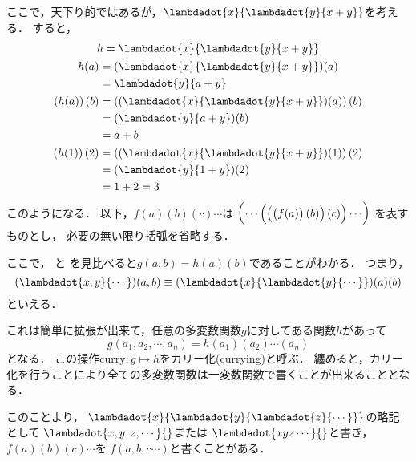 \documentclass[a4paper,titlepage,report]{jsbook}
\begin{document}
ここで，天下り的ではあるが，$\lambdadot{x}{\lambdadot{y}{x+y}}$を考える．
すると，
\begin{gather}
\begin{aligned}
\label{eq:lambda-curried}
h &= \lambdadot{x}{\lambdadot{y}{x+y}} \\
\end{aligned} \\
\begin{aligned}
\label{eq:lambda-curried-partial}
h(a) &= (\lambdadot{x}{\lambdadot{y}{x+y}})(a)\\
     &= {\lambdadot{y}{a+y}}
\end{aligned} \\
\begin{aligned}
\label{eq:lambda-curried-inst}
\left(h(a)\right)(b) &= \left((\lambdadot{x}{\lambdadot{y}{x+y}})(a)\right)(b) \\
        &= (\lambdadot{y}{a+y})(b)\\
        &= a + b
\end{aligned} \\
\begin{aligned}
\left(h(1)\right)(2) &= \left((\lambdadot{x}{\lambdadot{y}{x+y}})(1)\right)(2) \\
        &= (\lambdadot{y}{1+y})(2) \\
        &= 1 + 2 = 3
\end{aligned}
\end{gather}
このようになる．
以下，$f(a)(b)(c)\cdots$は
$\delimitershortfall-1pt\left({\cdots\left({\left({\left({f(a)}\right)(b)}\right)(c)}\right)\cdots}\right)$
を表すものとし，
必要の無い限り括弧を省略する．

ここで，
と
を見比べると$g(a, b) = h(a)(b)$であることがわかる．
つまり，
\begin{equation}
(\lambdadot{x,y}{\cdots})(a,b) \equiv (\lambdadot{x}{\lambdadot{y}{\cdots}})(a)(b)
\end{equation}
といえる．

これは簡単に拡張が出来て，任意の多変数関数$g$に対してある関数$h$があって
\begin{equation}
g(a_1, a_2, \cdots, a_n)= h(a_1)(a_2)\cdots(a_n)
\end{equation}
となる．
この操作$\mathrm{curry}: g\mapsto h$をカリー化(currying)と呼ぶ．
纏めると，カリー化を行うことにより全ての多変数関数は一変数関数で書くことが出来ることとなる．

このことより，
$\lambdadot{x}{\lambdadot{y}{\lambdadot{z}{\cdots}}}$の略記として
$\lambdadot{x,y,z,\cdots}{}$または
$\lambdadot{xyz\cdots}{}$と書き，
$f(a)(b)(c)\cdots$を
$f(a,b,c\cdots)$と書くことがある．
\end{document}
